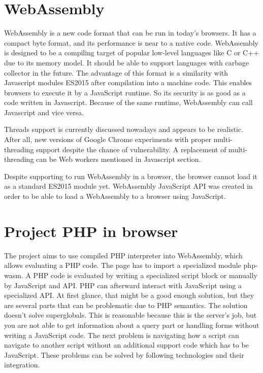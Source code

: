 \section{WebAssembly}

WebAssembly  is a new code format that can be run in today's browsers. 
It has a compact byte format, and its performance is near to a native code. 
WebAssembly is designed to be a compiling target of popular low-level languages like C or C++ due to its memory model. 
It should be able to support languages with carbage collector in the future. 
The advantage of this format is a similarity with Javascript modules ES2015 after compilation into a machine code. 
This enables browsers to execute it by a JavaScript runtime. 
So its security is as good as a code written in Javascript. 
Because of the same runtime, WebAssembly can call Javascript and vice versa.

Threads  support is currently discussed nowadays and appears to be realistic.
After all, new versions of Google Chrome experiments with proper multi-threading support despite the chance of vulnerability.
A replacement of multi-threading can be Web workers mentioned in Javascript section.


Despite supporting to run WebAssembly in a browser, the browser cannot load it as a standard ES2015 module yet.
WebAssembly JavaScript API was created in order to be able to load a WebAssembly to a browser using JavaScript.

\section{Project PHP in browser}

The project  aims to use compiled PHP interpreter into WebAssembly, which allows evaluating a PHP code.
The page has to import a specialized module php-wasm. 
A PHP code is evaluated by writing a specialized script block or manually by JavaScript and API.
PHP can afterward interact with JavaScript using a specialized API.
At first glance, that might be a good enough solution, but they are several parts that can be problematic due to PHP semantics.
The solution doesn't solve superglobals. 
This is reasonable because this is the server's job, but you are not able to get information about a query part or handling forms without writing a JavaScript code.
The next problem is navigating how a script can navigate to another script without an additional support code which has to be JavaScript.
These problems can be solved by following technologies and their integration.

